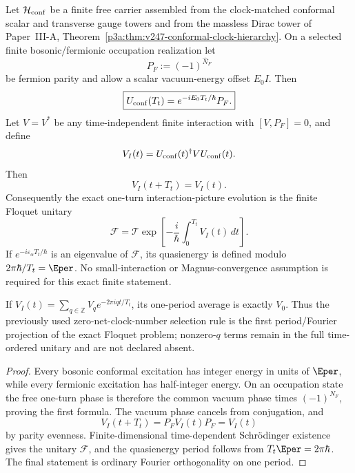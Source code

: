 \documentclass[12pt,a4paper]{article}
\begin{document}
\begin{theorem}
\label{p4:thm:v247-conformal-floquet}
Let \(\mathcal H_{\rm conf}\) be a finite free carrier assembled from the
clock-matched conformal scalar and transverse gauge towers and from the
massless Dirac tower of Paper~III-A,
Theorem~\ref{p3a:thm:v247-conformal-clock-hierarchy}.  On a selected finite
bosonic/fermionic occupation realization let
\[
 P_F:=(-1)^{\widehat N_F}
\]
be fermion parity and allow a scalar vacuum-energy offset \(E_0I\).  Then
\[
 \boxed{U_{\rm conf}(T_t)=e^{-iE_0T_t/\hbar}P_F.}
\]
Let \(V=V^*\) be any time-independent finite interaction with
\([V,P_F]=0\), and define
\[
 V_I(t)=U_{\rm conf}(t)^\dagger VU_{\rm conf}(t).
\]
Then
\[
 \boxed{V_I(t+T_t)=V_I(t).}
\]
Consequently the exact one-turn interaction-picture evolution is the finite
Floquet unitary
\[
 \boxed{\mathcal F
 =\mathcal T\exp\!\left[-\frac{i}{\hbar}
 \int_0^{T_t}V_I(t)\,dt\right].}
\]
If \(e^{-i\varepsilon_\alpha T_t/\hbar}\) is an eigenvalue of
\(\mathcal F\), its quasienergy is defined modulo
\(2\pi\hbar/T_t=\Eper\).  No small-interaction or Magnus-convergence
assumption is required for this exact finite statement.

If \(V_I(t)=\sum_{q\in\mathbb Z}V_qe^{-2\pi iqt/T_t}\), its one-period
average is exactly \(V_0\).  Thus the previously used zero-net-clock-number
selection rule is the first period/Fourier projection of the exact Floquet
problem; nonzero-\(q\) terms remain in the full time-ordered unitary and are
not declared absent.
\end{theorem}
\begin{proof}
Every bosonic conformal excitation has integer energy in units of \(\Eper\),
while every fermionic excitation has half-integer energy.  On an occupation
state the free one-turn phase is therefore the common vacuum phase times
\((-1)^{N_F}\), proving the first formula.  The vacuum phase cancels from
conjugation, and
\[
 V_I(t+T_t)=P_FV_I(t)P_F=V_I(t)
\]
by parity evenness.  Finite-dimensional time-dependent Schr\"odinger
existence gives the unitary \(\mathcal F\), and the quasienergy period follows
from \(T_t\Eper=2\pi\hbar\).  The final statement is ordinary Fourier
orthogonality on one period.
\end{proof}
\end{document}

